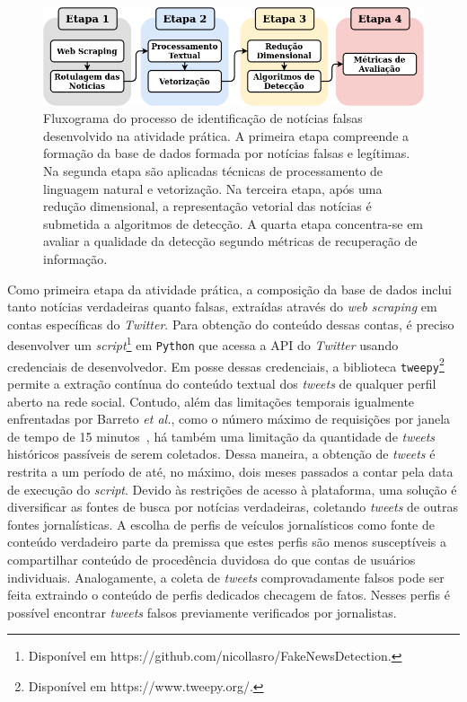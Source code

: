 \documentclass{SBCbookchapter}
\begin{document}
\begin{figure}[h]
	\centering
	\includegraphics[width=.9\columnwidth]{pratica.png}
	\caption{Fluxograma do processo de identificação de notícias falsas desenvolvido na atividade prática. A primeira etapa compreende a formação da base de dados formada por notícias falsas e legítimas. Na segunda etapa são aplicadas técnicas de processamento de linguagem natural e vetorização. Na terceira etapa, após uma redução dimensional, a representação vetorial das notícias é submetida a algoritmos de detecção. A quarta etapa concentra-se em avaliar a qualidade da detecção segundo métricas de recuperação de informação.}
	\label{fig:pratica}
\end{figure}

Como primeira etapa da atividade prática, a composição da base de dados inclui tanto notícias verdadeiras quanto falsas, extraídas através do \textit{web scraping} em contas específicas do \textit{Twitter}. Para obtenção do conteúdo dessas contas, é preciso desenvolver um \textit{script}\footnote{Disponível em https://github.com/nicollasro/FakeNewsDetection.} em \texttt{Python} que acessa a API do \textit{Twitter} usando credenciais de desenvolvedor. Em posse dessas credenciais, a biblioteca \texttt{tweepy}\footnote{Disponível em https://www.tweepy.org/.} permite a extração contínua do conteúdo textual dos \textit{tweets} de qualquer perfil aberto na rede social. Contudo, além das limitações temporais igualmente enfrentadas por Barreto \textit{et al.}, como o número máximo de requisições por janela de tempo de 15 minutos~\cite{barretospammers}, há também uma limitação da quantidade de \textit{tweets} históricos passíveis de serem coletados. Dessa maneira, a obtenção de \textit{tweets} é restrita a um período de até, no máximo, dois meses passados a contar pela data de execução do \textit{script}. %
Devido às restrições de acesso à plataforma, uma solução é diversificar as fontes de busca por notícias verdadeiras, coletando \textit{tweets} de outras fontes jornalísticas. A escolha de perfis de veículos jornalísticos como fonte de conteúdo verdadeiro parte da premissa que estes perfis são menos susceptíveis a compartilhar conteúdo de procedência duvidosa do que contas de usuários individuais. Analogamente, a coleta de \textit{tweets} comprovadamente falsos pode ser feita extraindo o conteúdo de perfis dedicados checagem de fatos. Nesses perfis é possível encontrar \textit{tweets} falsos previamente verificados por jornalistas.
\end{document}
